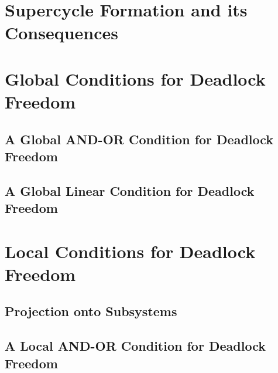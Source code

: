 \message{ !name(dfBIP.tex)}\documentclass[11pt]{article}
\begin{document}
\section{Supercycle Formation and its Consequences}
\label{s:scFormation}



\section{Global Conditions for Deadlock Freedom}
\label{s:global}

   \label{s:global.preamble}
   

   \subsection{A Global AND-OR Condition for Deadlock Freedom}
   \label{s:global.ANDOR}
   

   \subsection{A Global Linear Condition for Deadlock Freedom}
   \label{s:globCondition}
   \label{s:global.Linear}
   


\section{Local Conditions for Deadlock Freedom}
\label{s:local}

   \label{s:local.preamble}
   

   \subsection{Projection onto Subsystems}
   \label{s:projection}
   

   \clearpage
   \subsection{A Local AND-OR Condition for Deadlock Freedom}
   \label{s:ANDORcond}
   
\end{document}
